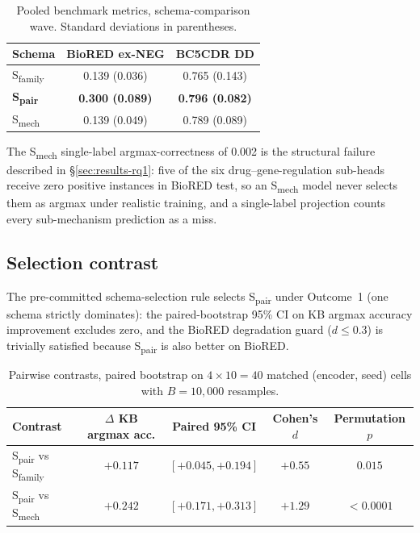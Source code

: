 \begin{table}[H]
\centering
\caption{Pooled benchmark metrics, schema-comparison wave.
Standard deviations in parentheses.}
\label{tab:s5-bench}
\small
\begin{tabular}{@{}lcc@{}}
\toprule
\textbf{Schema} & \textbf{BioRED ex-NEG} & \textbf{BC5CDR DD} \\
\midrule
S\textsubscript{family}    & 0.139 (0.036) & 0.765 (0.143) \\
\textbf{S\textsubscript{pair}} & \textbf{0.300 (0.089)} & \textbf{0.796 (0.082)} \\
S\textsubscript{mech}      & 0.139 (0.049) & 0.789 (0.089) \\
\bottomrule
\end{tabular}
\end{table}

The S\textsubscript{mech} single-label argmax-correctness of 0.002
is the structural failure described in \S\ref{sec:results-rq1}: five of the six
drug--gene-regulation sub-heads receive zero positive instances in
BioRED test, so an S\textsubscript{mech} model never selects them as
argmax under realistic training, and a single-label projection
counts every sub-mechanism prediction as a miss.

\subsection{Selection contrast}

The pre-committed schema-selection rule selects S\textsubscript{pair}
under Outcome~1 (one schema strictly dominates): the paired-bootstrap
95\% CI on KB argmax accuracy improvement excludes zero, and the
BioRED degradation guard ($d \le 0.3$) is trivially satisfied because
S\textsubscript{pair} is also better on BioRED.

\begin{table}[H]
\centering
\caption{Pairwise contrasts, paired bootstrap on $4 \times 10 = 40$
matched (encoder, seed) cells with $B = 10{,}000$ resamples.}
\label{tab:s5-selection}
\small
\begin{tabular}{@{}lcccc@{}}
\toprule
\textbf{Contrast} & \textbf{$\Delta$ KB argmax acc.} & \textbf{Paired 95\% CI} & \textbf{Cohen's $d$} & \textbf{Permutation $p$} \\
\midrule
S\textsubscript{pair} vs S\textsubscript{family} & $+0.117$ & $[+0.045, +0.194]$ & $+0.55$ & $0.015$ \\
S\textsubscript{pair} vs S\textsubscript{mech}    & $+0.242$ & $[+0.171, +0.313]$ & $+1.29$ & $<0.0001$ \\
\bottomrule
\end{tabular}
\end{table}

